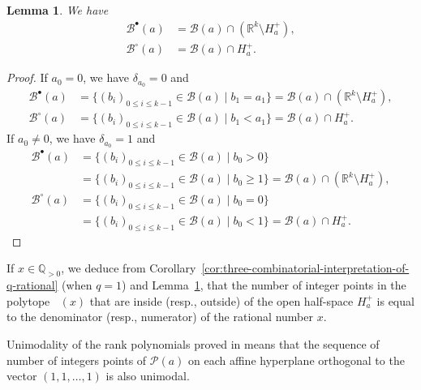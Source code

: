 \documentclass[a4paper,12pt]{amsart}
\newtheorem{lemma}[definition]{Lemma}
\newcommand{\Q}{\mathbb{Q}}
\newcommand{\R}{\mathbb{R}}
\newcommand{\xx}{{x}}
\newcommand{\Bcal}{{\mathcal{B}}}
\newcommand{\Pcal}{{\mathcal{P}}}
\newcommand{\0}{\mathtt{0}}
\newcommand{\1}{\mathtt{1}}
\newcommand{\2}{\mathtt{2}}
\newcommand{\3}{\mathtt{3}}
\DeclareMathOperator{\Pcaleven}{{\Pcal_{\text{even}}}}
\begin{document}
\begin{lemma}\label{lem:half-space-splits-the-polytope}
    We have
    \begin{align*}
        \Bcal^\bullet(a)
        &= \Bcal(a)\cap (\R^k\setminus H_a^+),\\
        \Bcal^\circ(a)
        &=\Bcal(a)\cap H_a^+.
    \end{align*}
\end{lemma}

\begin{proof}
    If $a_0=0$, we have $\delta_{a_0}=0$ and
    \begin{align*}
        \Bcal^\bullet(a)
        &=
        \{(b_i)_{0\leq i\leq k-1} \in\Bcal(a)
            \mid b_1=a_1
        \}
        =\Bcal(a)\cap (\R^k\setminus H_a^+)
        ,\\
        \Bcal^\circ(a)
        &=
        \{(b_i)_{0\leq i\leq k-1} \in\Bcal(a)
            \mid b_1<a_1
        \}
        =\Bcal(a)\cap H_a^+.
    \end{align*}
    If $a_0\neq0$, we have $\delta_{a_0}=1$ and
    \begin{align*}
        \Bcal^\bullet(a)
        &=
        \{(b_i)_{0\leq i\leq k-1}
        \in\Bcal(a)
            \mid
            b_0>0
        \}
        \\
        &=
        \{(b_i)_{0\leq i\leq k-1}
        \in\Bcal(a)
            \mid
            b_0\geq1
        \}
        =\Bcal(a)\cap (\R^k\setminus H_a^+)
        ,\\
        \Bcal^\circ(a)
        &=
        \{(b_i)_{0\leq i\leq k-1}
        \in\Bcal(a)
            \mid
            b_0=0
        \}
        \\
        &=
        \{(b_i)_{0\leq i\leq k-1}
        \in\Bcal(a)
            \mid
            b_0<1
        \}
        =\Bcal(a)\cap H_a^+.
    \end{align*}
\end{proof}

If $\xx\in\Q_{>0}$,
we deduce
from
Corollary~\ref{cor:three-combinatorial-interpretation-of-q-rational} (when $q=1$)
and Lemma~\ref{lem:half-space-splits-the-polytope},
that the number of integer points
in the polytope $\Pcaleven(x)$ that are inside (resp., outside) of the open half-space $H_a^+$
is equal to the denominator (resp., numerator) of the
rational number $\xx$.

Unimodality of the rank polynomials proved in \cite{MR4499341}
means that the sequence of number of integers points of $\Pcal(a)$ on each affine hyperplane
orthogonal to the vector $(1,1,\dots,1)$ is also unimodal.
\end{document}
